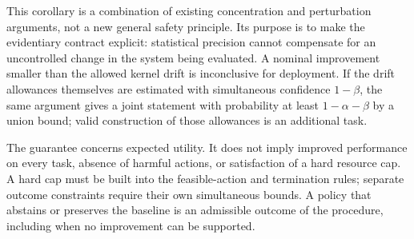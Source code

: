 This corollary is a combination of existing concentration and perturbation arguments, not a new general safety principle. Its purpose is to make the evidentiary contract explicit: statistical precision cannot compensate for an uncontrolled change in the system being evaluated. A nominal improvement smaller than the allowed kernel drift is inconclusive for deployment. If the drift allowances themselves are estimated with simultaneous confidence $1-\beta$, the same argument gives a joint statement with probability at least $1-\alpha-\beta$ by a union bound; valid construction of those allowances is an additional task.

The guarantee concerns expected utility. It does not imply improved performance on every task, absence of harmful actions, or satisfaction of a hard resource cap. A hard cap must be built into the feasible-action and termination rules; separate outcome constraints require their own simultaneous bounds. A policy that abstains or preserves the baseline is an admissible outcome of the procedure, including when no improvement can be supported.
